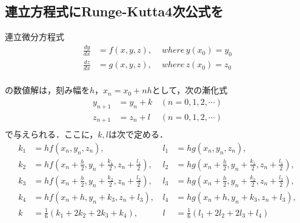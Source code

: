 \documentclass[11pt,dvipdfmx]{jsarticle}
\begin{document}
    \subsection{連立方程式にRunge-Kutta4次公式を}\label{ux9023ux7acbux65b9ux7a0bux5f0fux306brunge-kutta4ux6b21ux516cux5f0fux3092}

連立微分方程式 \[
\begin{aligned}
\frac{dy}{dx} &= f(x,y,z), &\, \, where \, y(x_0)=y_0 \\
\frac{dz}{dx} &= g(x,y,z), &\, \, where \, z(x_0)=z_0 \\
\end{aligned}
\]

の数値解は，刻み幅を\(h\)，\(x_n=x_0+nh\)として，次の漸化式 \[
\begin{aligned}
y_{n+1} & = y_n +k &\, (n=0,1,2,\cdots) \\
z_{n+1} & = z_n +l &\, (n=0,1,2,\cdots) \\
\end{aligned}
\] で与えられる．ここに，\(k,l\)は次で定める． \[
\begin{aligned}
k_1 &= hf(x_n,y_n,z_n), \,
&l_1 &= hg(x_n,y_n,z_n), \\
k_2 &= hf(x_n+\frac{h}{2}, y_n+\frac{k_1}{2}, z_n+\frac{l_1}{2}), \,
&l_2 &= hg(x_n+\frac{h}{2}, y_n+\frac{k_1}{2}, z_n+\frac{l_1}{2}), \\
k_3 &= hf(x_n+\frac{h}{2}, y_n+\frac{k_2}{2}, z_n+\frac{l_2}{2}), \,
&l_3 &= hg(x_n+\frac{h}{2}, y_n+\frac{k_2}{2}, z_n+\frac{l_2}{2}), \\
k_4 &= hf(x_n+h, y_n+k_3, z_n+l_3), \,
&l_4 &= hg(x_n+h, y_n+k_3, z_n+l_3), \\
k &= \frac{1}{6}(k_1+2k_2+2k_3+k_4), \,
&l &= \frac{1}{6}(l_1+2l_2+2l_3+l_4)
\end{aligned}
\]
\end{document}

